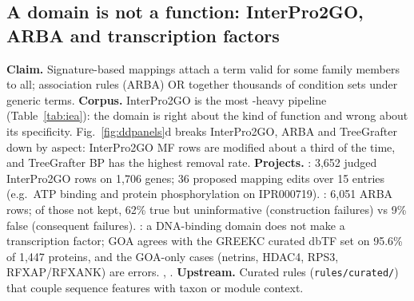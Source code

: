 \subsection{A domain is not a function: InterPro2GO, ARBA and transcription factors}\label{sec:dd-domain}
\textbf{Claim.} Signature-based mappings attach a term valid for some family members to all;
association rules (ARBA) OR together thousands of condition sets under generic terms.
\textbf{Corpus.} InterPro2GO is the most -heavy pipeline (Table~\ref{tab:iea}): the
domain is right about the kind of function and wrong about its specificity.
Fig.~\ref{fig:ddpanels}d breaks InterPro2GO, ARBA and TreeGrafter down by aspect: InterPro2GO MF rows
are modified about a third of the time, and TreeGrafter BP has the highest removal rate.
\textbf{Projects.} : 3,652 judged InterPro2GO rows on 1,706 genes; 36 proposed mapping
edits over 15 entries (e.g.\ ATP binding and protein phosphorylation on IPR000719).
: 6,051 ARBA rows; of those not kept, 62\% true but uninformative (construction
failures) vs 9\% false (consequent failures). : a DNA-binding domain
does not make a transcription factor; GOA agrees with the GREEKC curated dbTF set on 95.6\% of
1,447 proteins, and the GOA-only cases (netrins, HDAC4, RPS3, RFXAP/RFXANK) are errors.
, .
\textbf{Upstream.} Curated rules (\texttt{rules/curated/}) that couple sequence features with taxon or
module context. 
